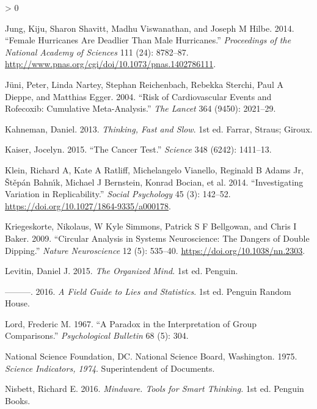 \documentclass[
  10pt,
  b5paper]{book}
\newlength{\cslhangindent}
\newenvironment{CSLReferences}[2] %
 {%
  \setlength{\parindent}{0pt}
  \ifodd #1 \everypar{\setlength{\hangindent}{\cslhangindent}}\ignorespaces\fi
  \ifnum #2 > 0
  \setlength{\parskip}{#2\baselineskip}
  \fi
 }%
 {}
\begin{document}
\begin{CSLReferences}{1}{0}
\leavevmode\hypertarget{ref-jung2014female}{}%
Jung, Kiju, Sharon Shavitt, Madhu Viswanathan, and Joseph M Hilbe. 2014. {``Female Hurricanes Are Deadlier Than Male Hurricanes.''} \emph{Proceedings of the National Academy of Sciences} 111 (24): 8782--87. \url{http://www.pnas.org/cgi/doi/10.1073/pnas.1402786111}.

\leavevmode\hypertarget{ref-juni2004risk}{}%
Jüni, Peter, Linda Nartey, Stephan Reichenbach, Rebekka Sterchi, Paul A Dieppe, and Matthias Egger. 2004. {``Risk of Cardiovascular Events and Rofecoxib: Cumulative Meta-Analysis.''} \emph{The Lancet} 364 (9450): 2021--29.

\leavevmode\hypertarget{ref-kahneman_2013}{}%
Kahneman, Daniel. 2013. \emph{Thinking, Fast and Slow}. 1st ed. Farrar, Straus; Giroux.

\leavevmode\hypertarget{ref-r5_kaiser_2015}{}%
Kaiser, Jocelyn. 2015. {``The Cancer Test.''} \emph{Science} 348 (6242): 1411--13.

\leavevmode\hypertarget{ref-r7_klein_others_2014}{}%
Klein, Richard A, Kate A Ratliff, Michelangelo Vianello, Reginald B Adams Jr, Štěpán Bahnı́k, Michael J Bernstein, Konrad Bocian, et al. 2014. {``Investigating Variation in Replicability.''} \emph{Social Psychology} 45 (3): 142--52. \url{https://doi.org/10.1027/1864-9335/a000178}.

\leavevmode\hypertarget{ref-r8_kriegeskorte_simmons_bellgowan_baker_2009}{}%
Kriegeskorte, Nikolaus, W Kyle Simmons, Patrick S F Bellgowan, and Chris I Baker. 2009. {``Circular Analysis in Systems Neuroscience: The Dangers of Double Dipping.''} \emph{Nature Neuroscience} 12 (5): 535--40. \url{https://doi.org/10.1038/nn.2303}.

\leavevmode\hypertarget{ref-levitin_2015}{}%
Levitin, Daniel J. 2015. \emph{The Organized Mind}. 1st ed. Penguin.

\leavevmode\hypertarget{ref-levitin_2016}{}%
---------. 2016. \emph{A Field Guide to Lies and Statistics}. 1st ed. Penguin Random House.

\leavevmode\hypertarget{ref-lord1967paradox}{}%
Lord, Frederic M. 1967. {``A Paradox in the Interpretation of Group Comparisons.''} \emph{Psychological Bulletin} 68 (5): 304.

\leavevmode\hypertarget{ref-national1975science}{}%
National Science Foundation, DC. National Science Board, Washington. 1975. \emph{Science Indicators, 1974}. Superintendent of Documents.

\leavevmode\hypertarget{ref-nisbett}{}%
Nisbett, Richard E. 2016. \emph{Mindware. Tools for Smart Thinking.} 1st ed. Penguin Books.


\end{CSLReferences}
\end{document}
